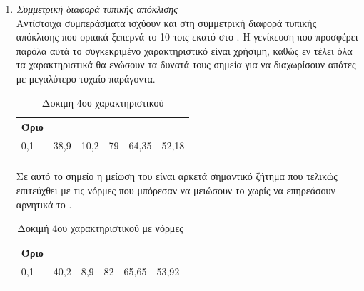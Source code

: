 \begin{enumerate}
\item{\textit{Συμμετρική διαφορά τυπικής απόκλισης}} \\
Αντίστοιχα συμπεράσματα ισχύουν και στη συμμετρική διαφορά τυπικής απόκλισης που οριακά ξεπερνά το 10 τοις εκατό στο . Η γενίκευση που προσφέρει παρόλα αυτά το συγκεκριμένο χαρακτηριστικό είναι χρήσιμη, καθώς εν τέλει όλα τα χαρακτηριστικά θα ενώσουν τα δυνατά τους σημεία για να διαχωρίσουν απάτες με μεγαλύτερο τυχαίο παράγοντα.
\begin{center}
\begin{longtabu} to 0.8\textwidth { | X[c] || X[c] | X[c] | X[c] | X[c] | X[c] |  }
 \hline
  Όριο &   &  &  &  & \\
 ,1&	38,9&	10,2&	79&	64,35&	52,18 \\
\hline
\caption{Δοκιμή 4ου χαρακτηριστικού}
\label{testfeat4}
\end{longtabu}
\end{center}
Σε αυτό το σημείο η μείωση του  είναι αρκετά σημαντικό ζήτημα που τελικώς επιτεύχθει με τις νόρμες που μπόρεσαν να μειώσουν το  χωρίς να επηρεάσουν αρνητικά το . 
\begin{center}
\begin{longtabu} to 0.8\textwidth { | X[c] || X[c] | X[c] | X[c] | X[c] | X[c] |  }
 \hline
  Όριο &   &  &  &  & \\
 ,1&	40,2&	8,9&	82&	65,65&	53,92\\
\hline
\caption{Δοκιμή 4ου χαρακτηριστικού με νόρμες}
\label{testfeat4norms}
\end{longtabu}
\end{center}


\end{enumerate}
